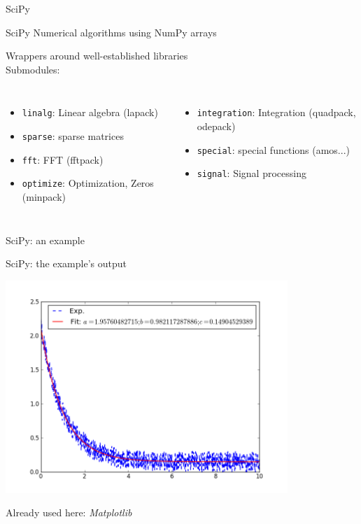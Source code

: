 \begin{frame}{SciPy}

\begin{exbox}{SciPy}
Numerical algorithms using NumPy arrays
\end{exbox}

Wrappers around well-established libraries\\[1.0ex]

Submodules:

\begin{columns}


\begin{itemize}
	\item {\texttt{linalg}}: Linear algebra (lapack)
	\item{\texttt{sparse}}: sparse matrices
	\item {\texttt{fft}}: FFT (fftpack)
	\item {\texttt{optimize}}: Optimization, Zeros (minpack)
\end{itemize}



\begin{itemize}
	\item {\texttt{integration}}: Integration (quadpack, odepack)
	\item {\texttt{special}}: special functions (amos...)
	\item {\texttt{signal}}: Signal processing
\end{itemize}

\end{columns}

\end{frame}

\begin{frame}[fragile]{SciPy: an example}



\end{frame}

\begin{frame}{SciPy: the example's output}

\begin{center}
	\includegraphics[width=0.8\textwidth]{Figures/fit-png}
\end{center}

Already used here: \emph{Matplotlib}

\end{frame}

